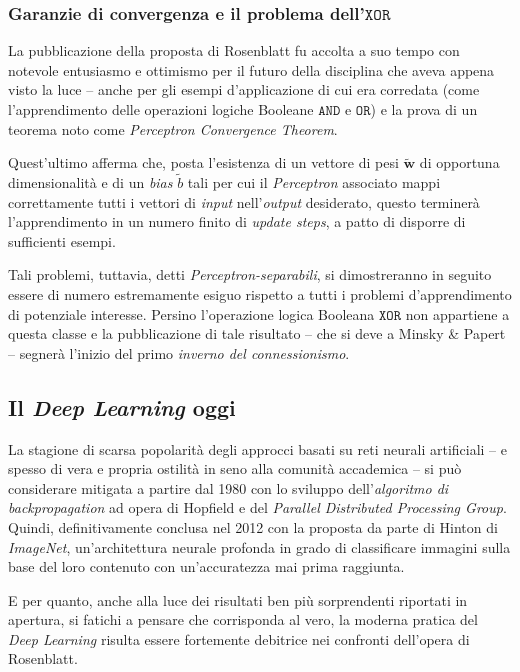 \documentclass[a4paper, twoside]{article}
\begin{document}
\subsubsection{Garanzie di convergenza e il problema dell'$ \mathtt{XOR} $}

La pubblicazione della proposta di Rosenblatt fu accolta a suo tempo con notevole entusiasmo e ottimismo per il futuro della disciplina che aveva appena visto la luce -- anche per gli esempi d'applicazione di cui era corredata (come l'apprendimento delle operazioni logiche Booleane $\mathtt{AND}$ e $\mathtt{OR}$) e la prova di un teorema noto come \textit{Perceptron Convergence Theorem}.

Quest'ultimo afferma che, posta l'esistenza di un vettore di pesi $\boldsymbol{\tilde{w}}$ di opportuna dimensionalità e di un \textit{bias} $\tilde{b}$ tali per cui il \textit{Perceptron} associato mappi correttamente tutti i vettori di \textit{input} nell'\textit{output} desiderato, questo terminerà l'apprendimento in un numero finito di \textit{update steps}, a patto di disporre di sufficienti esempi.

Tali problemi, tuttavia, detti \textit{Perceptron-separabili}, si dimostreranno in seguito essere di numero estremamente esiguo rispetto a tutti i problemi d'apprendimento di potenziale interesse. Persino l'operazione logica Booleana $\mathtt{XOR}$ non appartiene a questa classe e la pubblicazione di tale risultato -- che si deve a Minsky \& Papert -- segnerà l'inizio del primo \textit{inverno del connessionismo}.


\subsection{Il \textit{Deep Learning} oggi}

La stagione di scarsa popolarità degli approcci basati su reti neurali artificiali -- e spesso di vera e propria ostilità in seno alla comunità accademica -- si può considerare mitigata a partire dal 1980 con lo sviluppo dell'\textit{algoritmo di backpropagation} ad opera di Hopfield e del \textit{Parallel Distributed Processing Group}. Quindi, definitivamente conclusa nel 2012 con la proposta da parte di Hinton di \textit{ImageNet}, un'architettura neurale profonda in grado di classificare immagini sulla base del loro contenuto con un'accuratezza mai prima raggiunta.

E per quanto, anche alla luce dei risultati ben più sorprendenti riportati in apertura, si fatichi a pensare che corrisponda al vero, la moderna pratica del \textit{Deep Learning} risulta essere fortemente debitrice nei confronti dell'opera di Rosenblatt.
\end{document}

